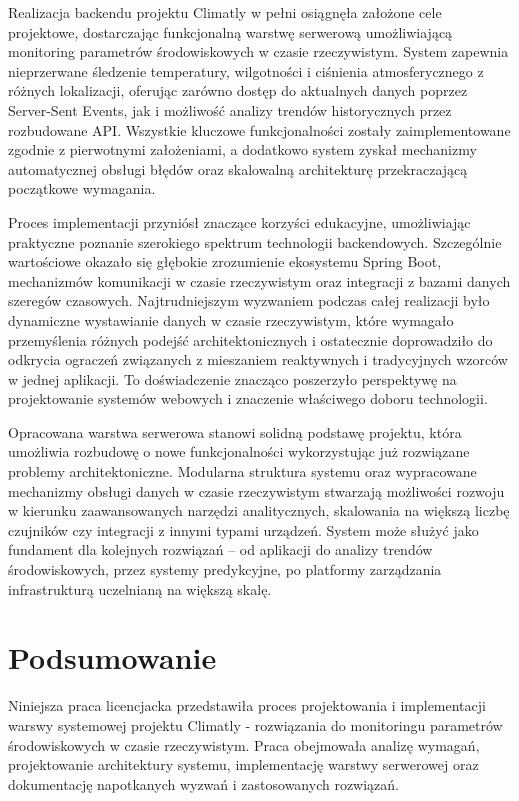 \documentclass[a4paper,12pt,openany]{book}
\renewcommand{\chaptermark}[1]{\markboth{#1}{}}
\begin{document}
Realizacja backendu projektu Climatly w pełni osiągnęła założone cele projektowe, dostarczając funkcjonalną warstwę serwerową umożliwiającą monitoring parametrów środowiskowych w czasie rzeczywistym. System zapewnia nieprzerwane śledzenie temperatury, wilgotności i ciśnienia atmosferycznego z różnych lokalizacji, oferując zarówno dostęp do aktualnych danych poprzez Server-Sent Events, jak i możliwość analizy trendów historycznych przez rozbudowane API. Wszystkie kluczowe funkcjonalności zostały zaimplementowane zgodnie z pierwotnymi założeniami, a dodatkowo system zyskał mechanizmy automatycznej obsługi błędów oraz skalowalną architekturę przekraczającą początkowe wymagania.

Proces implementacji przyniósł znaczące korzyści edukacyjne, umożliwiając praktyczne poznanie szerokiego spektrum technologii backendowych. Szczególnie wartościowe okazało się głębokie zrozumienie ekosystemu Spring Boot, mechanizmów komunikacji w czasie rzeczywistym oraz integracji z bazami danych szeregów czasowych. Najtrudniejszym wyzwaniem podczas całej realizacji było dynamiczne wystawianie danych w czasie rzeczywistym, które wymagało przemyślenia różnych podejść architektonicznych i ostatecznie doprowadziło do odkrycia ograczeń związanych z mieszaniem reaktywnych i tradycyjnych wzorców w jednej aplikacji. To doświadczenie znacząco poszerzyło perspektywę na projektowanie systemów webowych i znaczenie właściwego doboru technologii.

Opracowana warstwa serwerowa stanowi solidną podstawę projektu, która umożliwia rozbudowę o nowe funkcjonalności wykorzystując już rozwiązane problemy architektoniczne. Modularna struktura systemu oraz wypracowane mechanizmy obsługi danych w czasie rzeczywistym stwarzają możliwości rozwoju w kierunku zaawansowanych narzędzi analitycznych, skalowania na większą liczbę czujników czy integracji z innymi typami urządzeń. System może służyć jako fundament dla kolejnych rozwiązań -- od aplikacji do analizy trendów środowiskowych, przez systemy predykcyjne, po platformy zarządzania infrastrukturą uczelnianą na większą skalę.
\chapter*{Podsumowanie}
\chaptermark{Podsumowanie}

Niniejsza praca licencjacka przedstawiła proces projektowania i implementacji warswy systemowej projektu Climatly - rozwiązania do monitoringu parametrów środowiskowych w czasie rzeczywistym. Praca obejmowała analizę wymagań, projektowanie architektury systemu, implementację warstwy serwerowej oraz dokumentację napotkanych wyzwań i zastosowanych rozwiązań.
\end{document}
